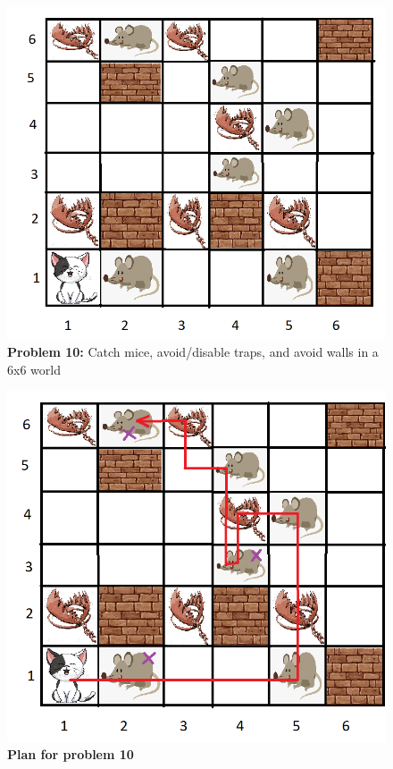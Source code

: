 \begin{multicols}{2}

\begin{figure}[H]
    \centering
    \includegraphics[width=\linewidth]{fig/A3/cat_10.png}
    \caption{\textbf{Problem 10:} Catch mice, avoid/disable traps, and avoid walls in a 6x6 world}
    \label{fig:cat_10}
\end{figure}

\columnbreak

\begin{figure}[H]
    \centering
    \includegraphics[width=\linewidth]{fig/A3/cat_10_sol.png}
    \caption{\textbf{Plan for problem 10}}
    \label{fig:cat_10_sol}
\end{figure}

\end{multicols}

